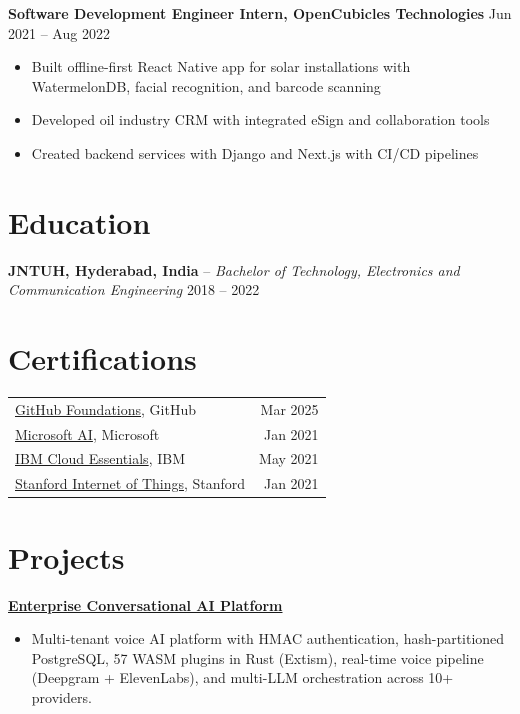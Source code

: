 \documentclass[11pt,a4paper]{article}
\begin{document}
\vspace{14pt}
\noindent\textbf{Software Development Engineer Intern, OpenCubicles Technologies} \hfill Jun 2021 -- Aug 2022
\begin{itemize}[leftmargin=*, topsep=8pt, itemsep=8pt, parsep=0pt]
    \item Built offline-first React Native app for solar installations with WatermelonDB, facial recognition, and barcode scanning
    \item Developed oil industry CRM with integrated eSign and collaboration tools
    \item Created backend services with Django and Next.js with CI/CD pipelines
\end{itemize}

\section{Education}
\vspace{8pt}
\noindent\textbf{JNTUH, Hyderabad, India} -- \textit{Bachelor of Technology, Electronics and Communication Engineering} \hfill 2018 -- 2022

\section{Certifications}
\vspace{6pt}
\begin{tabularx}{\textwidth}{@{}X r@{}}
\href{https://www.credly.com/}{\textcolor{linkblue}{GitHub Foundations}}, GitHub & Mar 2025 \\[8pt]
\href{https://www.credly.com/}{\textcolor{linkblue}{Microsoft AI}}, Microsoft & Jan 2021 \\[8pt]
\href{https://www.credly.com/}{\textcolor{linkblue}{IBM Cloud Essentials}}, IBM & May 2021 \\[8pt]
\href{https://www.coursera.org/}{\textcolor{linkblue}{Stanford Internet of Things}}, Stanford & Jan 2021 \\
\end{tabularx}

\section{Projects}

\noindent\textbf{\href{https://shanmukeshwar.dev}{\textcolor{linkblue}{Enterprise Conversational AI Platform}}}
\begin{itemize}[leftmargin=*, topsep=6pt, itemsep=6pt, parsep=0pt]
    \item Multi-tenant voice AI platform with HMAC authentication, hash-partitioned PostgreSQL, 57 WASM plugins in Rust (Extism), real-time voice pipeline (Deepgram + ElevenLabs), and multi-LLM orchestration across 10+ providers.
\end{itemize}
\end{document}
